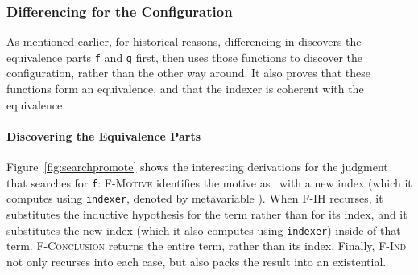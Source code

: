 \subsubsection{Differencing for the Configuration}

As mentioned earlier, for historical reasons, differencing in \toolnamec discovers the equivalence parts \lstinline{f} and \lstinline{g} first, then uses
those functions to discover the configuration, rather than the other way around.
It also proves that these functions form an equivalence, and that the indexer is coherent with the equivalence.

\paragraph{Discovering the Equivalence Parts}
Figure~\ref{fig:searchpromote} shows the interesting derivations for the judgment 
that searches for \lstinline{f}:
\textsc{F-Motive} identifies the motive 
as \B\ with a new index (which it computes using \lstinline{indexer}, denoted by metavariable \smallmath{$\pi$}).
When \textsc{F-IH} recurses, it substitutes the inductive hypothesis for the term rather than
for its index, and it substitutes the new index (which it also computes using \lstinline{indexer}) inside of that term.
\textsc{F-Conclusion} returns the entire term, rather than its index.
Finally, \textsc{F-Ind} not only recurses into each case, but also packs the result into an existential.


